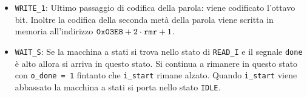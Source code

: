 \documentclass[fleqn,11pt]{article}
\begin{document}
\begin{itemize}
    \item \verb|WRITE_1|: Ultimo passaggio di codifica della parola: viene codificato l'ottavo bit. Inoltre la codifica della seconda metà della parola viene scritta in memoria all'indirizzo \(\verb|0x03E8| + 2\cdot\verb|rmr| + 1\).
    \item \verb|WAIT_S|: Se la macchina a stati si trova nello stato di \verb|READ_I| e il segnale \verb|done| è alto allora si arriva in questo stato. Si continua a rimanere in questo stato con \verb|o_done = 1| fintanto che \verb|i_start| rimane alzato. Quando \verb|i_start| viene abbassato la macchina a stati si porta nello stato \verb|IDLE|.
\end{itemize}

\pagebreak
\null
\vfill
\begin{figure}[h]
    \centering
\end{figure}
\end{document}
